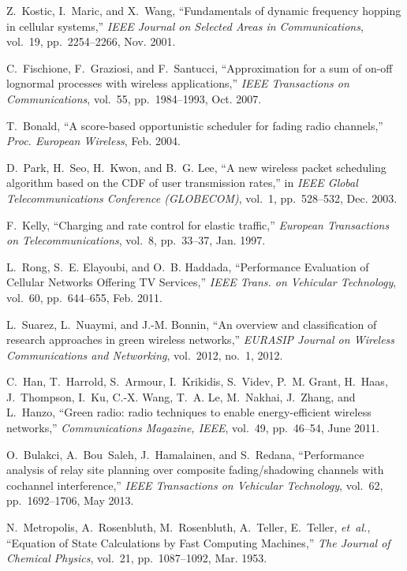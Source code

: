 \documentclass[draftcls,onecolumn]{IEEEtran}
\theoremstyle{plain}
\theoremstyle{definition}
\begin{document}
\begin{thebibliography}{10}
Z.~Kostic, I.~Maric, and X.~Wang, ``Fundamentals of dynamic frequency hopping
  in cellular systems,'' {\em IEEE Journal on Selected Areas in
  Communications}, vol.~19, pp.~2254--2266, Nov. 2001.

C.~Fischione, F.~Graziosi, and F.~Santucci, ``Approximation for a sum of on-off
  lognormal processes with wireless applications,'' {\em IEEE Transactions on
  Communications}, vol.~55, pp.~1984--1993, Oct. 2007.

T.~Bonald, ``A score-based opportunistic scheduler for fading radio channels,''
  {\em Proc. European Wireless}, Feb. 2004.

D.~Park, H.~Seo, H.~Kwon, and B.~G. Lee, ``A new wireless packet scheduling
  algorithm based on the {CDF} of user transmission rates,'' in {\em IEEE
  Global Telecommunications Conference (GLOBECOM)}, vol.~1, pp.~528--532, Dec.
  2003.

F.~Kelly, ``Charging and rate control for elastic traffic,'' {\em European
  Transactions on Telecommunications}, vol.~8, pp.~33--37, Jan. 1997.

L.~Rong, S.~E. Elayoubi, and O.~B. Haddada, ``{Performance Evaluation of
  Cellular Networks Offering TV Services},'' {\em {IEEE Trans. on Vehicular
  Technology}}, vol.~60, pp.~644--655, Feb. 2011.

L.~Suarez, L.~Nuaymi, and J.-M. Bonnin, ``An overview and classification of
  research approaches in green wireless networks,'' {\em EURASIP Journal on
  Wireless Communications and Networking}, vol.~2012, no.~1, 2012.

C.~Han, T.~Harrold, S.~Armour, I.~Krikidis, S.~Videv, P.~M. Grant, H.~Haas,
  J.~Thompson, I.~Ku, C.-X. Wang, T.~A. Le, M.~Nakhai, J.~Zhang, and L.~Hanzo,
  ``Green radio: radio techniques to enable energy-efficient wireless
  networks,'' {\em Communications Magazine, IEEE}, vol.~49, pp.~46--54, June
  2011.

O.~Bulakci, A.~Bou~Saleh, J.~Hamalainen, and S.~Redana, ``Performance analysis
  of relay site planning over composite fading/shadowing channels with
  cochannel interference,'' {\em IEEE Transactions on Vehicular Technology},
  vol.~62, pp.~1692--1706, May 2013.

N.~Metropolis, A.~Rosenbluth, M.~Rosenbluth, A.~Teller, E.~Teller, {\em
  et~al.}, ``{Equation of State Calculations by Fast Computing Machines},''
  {\em {The Journal of Chemical Physics}}, vol.~21, pp.~1087--1092, {Mar.}
  1953.


\end{thebibliography}
\end{document}
